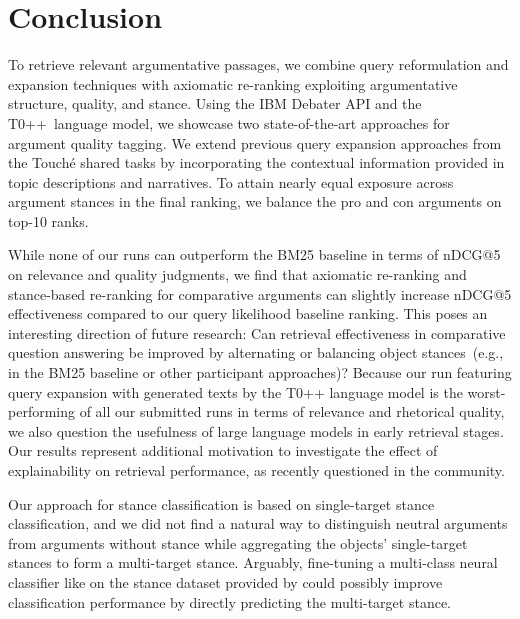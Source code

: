 \section{Conclusion}

To retrieve relevant argumentative passages, we combine query reformulation and expansion techniques with axiomatic re-ranking exploiting argumentative structure, quality, and stance.
Using the IBM Debater API and the T0++~language model, we showcase two state-of-the-art approaches for argument quality tagging.
We extend previous query expansion approaches from the Touché shared tasks by incorporating the contextual information provided in topic descriptions and narratives.
To attain nearly equal exposure across argument stances in the final ranking, we balance the pro and con arguments on top-10 ranks.

While none of our runs can outperform the BM25 baseline in terms of nDCG@5 on relevance and quality judgments, we find that axiomatic re-ranking and stance-based re-ranking for comparative arguments can slightly increase nDCG@5 effectiveness compared to our query likelihood baseline ranking. This poses an interesting direction of future research: Can retrieval effectiveness in comparative question answering be improved by alternating or balancing object stances~(e.g., in the BM25 baseline or other participant approaches)?
Because our run featuring query expansion with generated texts by the T0++ language model is the worst-performing of all our submitted runs in terms of relevance and rhetorical quality, we also question the usefulness of large language models in early retrieval stages. Our results represent additional motivation to investigate the effect of explainability on retrieval performance, as recently questioned in the community.

Our approach for stance classification is based on single-target stance classification, and we did not find a natural way to distinguish neutral arguments from arguments without stance while aggregating the objects' single-target stances to form a multi-target stance.
Arguably, fine-tuning a multi-class neural classifier like \Bert on the stance dataset provided by \citeauthor{BondarenkoFKSGBPBSWPH2022} could possibly improve classification performance by directly predicting the multi-target stance.